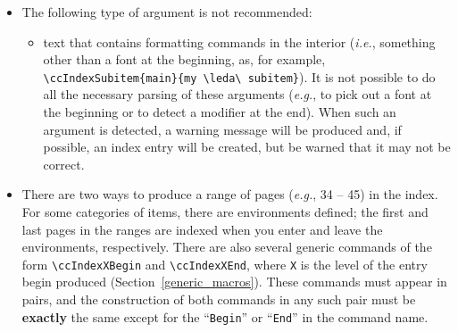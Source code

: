 \documentclass[11pt]{article}
\begin{document}
\begin{itemize}
\begin{itemize}
                 Also, if you have defined a command that expands
                 to something like \verb|{\bf text}| (with or without the 
                 braces), this will cause {\tt makeindex} to complain since 
                 the indexing macros cannot pick off the font in order to
                 produce the proper
                 formatting of ``text''. (The shortcut commands such as
                 \verb|\leda|, which are allowed as stand-alone arguments, 
                 are handled as special cases.)
         \end{itemize}
   \item The following type of argument is not recommended:
         \begin{itemize}
           \item text that contains formatting commands in the interior%
                 ({\it i.e.}, something other than a font at the beginning, as,
                 for example, \verb|\ccIndexSubitem{main}{my \leda\ subitem}|). 
                 It is not possible to do all the necessary parsing of these
                 arguments ({\it e.g.}, to pick out a font at the beginning 
                 or to detect a modifier at the end). When such an
                 argument is detected, a warning message will be produced and,
                 if possible, an index entry will be created, but be warned
                 that it may not be correct.
         \end{itemize}
   \item There are two ways to produce a range of pages ({\em e.g.}, 34 -- 45)
          in the index.  For some categories of items, there 
         are environments 
         defined; the first and last pages in the ranges are indexed when
         you enter and leave the environments, respectively.  There are also
         several generic commands of the form \verb|\ccIndexXBegin| and 
         \verb|\ccIndexXEnd|, where {\tt X} is the level of the entry begin 
         produced (Section~\ref{generic_macros}).  These commands must 
         appear in pairs, and the construction of both commands in any such 
         pair must be {\bf exactly} the same 
         except for the ``{\tt Begin}'' or ``{\tt End}'' in the command name.


\end{itemize}
\end{document}
